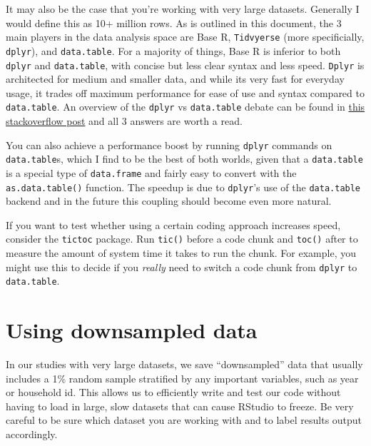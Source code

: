 \documentclass[
]{book}
\begin{document}
It may also be the case that you're working with very large datasets. Generally I would define this as 10+ million rows. As is outlined in this document, the 3 main players in the data analysis space are Base R, \texttt{Tidvyerse} (more specificially, \texttt{dplyr}), and \texttt{data.table}. For a majority of things, Base R is inferior to both \texttt{dplyr} and \texttt{data.table}, with concise but less clear syntax and less speed. \texttt{Dplyr} is architected for medium and smaller data, and while its very fast for everyday usage, it trades off maximum performance for ease of use and syntax compared to \texttt{data.table}. An overview of the \texttt{dplyr} vs \texttt{data.table} debate can be found in \href{https://stackoverflow.com/questions/21435339/data-table-vs-dplyr-can-one-do-something-well-the-other-cant-or-does-poorly/27840349\#27840349}{this stackoverflow post} and all 3 answers are worth a read.

You can also achieve a performance boost by running \texttt{dplyr} commands on \texttt{data.table}s, which I find to be the best of both worlds, given that a \texttt{data.table} is a special type of \texttt{data.frame} and fairly easy to convert with the \texttt{as.data.table()} function. The speedup is due to \texttt{dplyr}'s use of the \texttt{data.table} backend and in the future this coupling should become even more natural.

If you want to test whether using a certain coding approach increases speed, consider the \texttt{tictoc} package. Run \texttt{tic()} before a code chunk and \texttt{toc()} after to measure the amount of system time it takes to run the chunk. For example, you might use this to decide if you \emph{really} need to switch a code chunk from \texttt{dplyr} to \texttt{data.table}.

\hypertarget{using-downsampled-data}{%
\section{Using downsampled data}\label{using-downsampled-data}}

In our studies with very large datasets, we save ``downsampled'' data that usually includes a 1\% random sample stratified by any important variables, such as year or household id. This allows us to efficiently write and test our code without having to load in large, slow datasets that can cause RStudio to freeze. Be very careful to be sure which dataset you are working with and to label results output accordingly.
\end{document}

